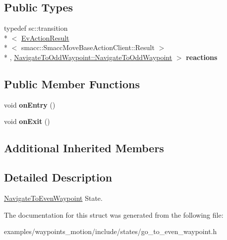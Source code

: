 \subsection*{Public Types}
\begin{DoxyCompactItemize}
\item 
\hypertarget{structNavigateToEvenWaypoint_1_1NavigateToEvenWaypoint_a679bd0d719bf338ba0adbb7516aa7031}{typedef sc\-::transition\\*
$<$ \hyperlink{structsmacc_1_1EvActionResult}{Ev\-Action\-Result}\\*
$<$ smacc\-::\-Smacc\-Move\-Base\-Action\-Client\-::\-Result $>$\\*
, \hyperlink{structNavigateToOddWaypoint_1_1NavigateToOddWaypoint}{Navigate\-To\-Odd\-Waypoint\-::\-Navigate\-To\-Odd\-Waypoint} $>$ {\bfseries reactions}}\label{structNavigateToEvenWaypoint_1_1NavigateToEvenWaypoint_a679bd0d719bf338ba0adbb7516aa7031}

\end{DoxyCompactItemize}
\subsection*{Public Member Functions}
\begin{DoxyCompactItemize}
\item 
\hypertarget{structNavigateToEvenWaypoint_1_1NavigateToEvenWaypoint_a2b03368922b1ec0f2e27843ef8f4e46f}{void {\bfseries on\-Entry} ()}\label{structNavigateToEvenWaypoint_1_1NavigateToEvenWaypoint_a2b03368922b1ec0f2e27843ef8f4e46f}

\item 
\hypertarget{structNavigateToEvenWaypoint_1_1NavigateToEvenWaypoint_ac479165ac75b4edcd92125ff2b7c0bb3}{void {\bfseries on\-Exit} ()}\label{structNavigateToEvenWaypoint_1_1NavigateToEvenWaypoint_ac479165ac75b4edcd92125ff2b7c0bb3}

\end{DoxyCompactItemize}
\subsection*{Additional Inherited Members}


\subsection{Detailed Description}
\hyperlink{structNavigateToEvenWaypoint_1_1NavigateToEvenWaypoint}{Navigate\-To\-Even\-Waypoint} State. 

The documentation for this struct was generated from the following file\-:\begin{DoxyCompactItemize}
\item 
examples/waypoints\-\_\-motion/include/states/go\-\_\-to\-\_\-even\-\_\-waypoint.\-h\end{DoxyCompactItemize}
